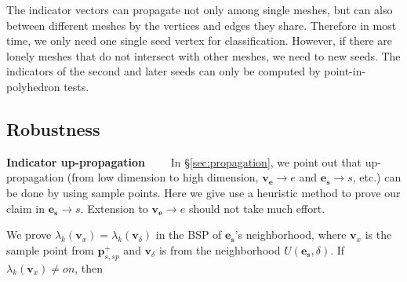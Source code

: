 \documentclass[10pt,journal,compsoc]{IEEEtran}
\begin{document}
\vspace{0.5em}\noindent The indicator vectors can propagate not only among single meshes, but can also between different meshes by the vertices and edges they share. Therefore in most time, we only need one single seed vertex for classification. However, if there are lonely meshes that do not intersect with other meshes, we need to new seeds. The indicators of the second and later seeds can only be computed by point-in-polyhedron tests.



\iffalse

\subsection{Robustness}

\vspace{0.5em}
\noindent\textbf{Indicator up-propagation}~~~~
In \S\ref{sec:propagation}, we point out that up-propagation (from low dimension to high dimension, $\bm{v}_{\bm{e}}\to e$ and $\bm{e}_{\bm{s}}\to s$, etc.) can be done by using sample points. Here we give use a heuristic method to prove our claim in $\bm{e}_{\bm{s}}\to s$. Extension to $\bm{v}_{\bm{e}}\to e$ should not take much effort.

\vspace{0.5em}\noindent We prove $\lambda_k(\bm{v}_x)=\lambda_k(\bm{v}_{\delta})$ in the BSP of $\bm{e}_{\bm{s}}$'s neighborhood, where $ \bm{v}_x$ is the sample point from $\bm{p}_{s, sp}^+$ and $\bm{v}_{\delta}$ is from the neighborhood $U(\bm{e}_{\bm{s}}, \delta)$. If $\lambda_k(\bm{v}_x) \neq on$, then
\end{document}
